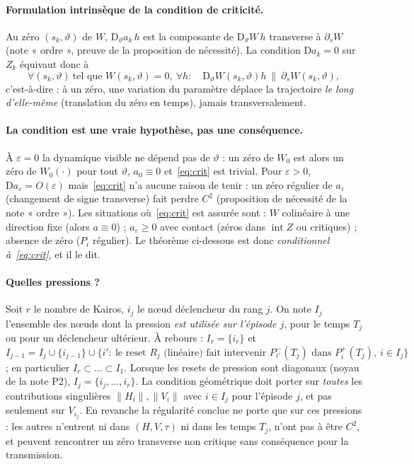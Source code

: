 \documentclass[11pt,a4paper]{article}
\theoremstyle{remark}
\newcommand{\vth}{\vartheta}
\newcommand{\D}{\mathrm D}
\begin{document}
\paragraph{Formulation intrinsèque de la condition de criticité.} Au zéro $(s_k,\vth)$ de $W$, $\D_\vth a_k\,h$ est la composante de $\D_\vth W\,h$ transverse à $\partial_sW$ (note « ordre », preuve de la proposition de nécessité). La condition $\D a_k=0$ sur $Z_k$ équivaut donc à
\begin{equation}\label{eq:crit}
\forall(s_k,\vth)\ \text{tel que } W(s_k,\vth)=0,\ \forall h:\quad \D_\vth W(s_k,\vth)h\ \parallel\ \partial_sW(s_k,\vth),
\end{equation}
c'est-à-dire : à un zéro, une variation du paramètre déplace la trajectoire \emph{le long d'elle-même} (translation du zéro en temps), jamais transversalement.

\paragraph{La condition est une vraie hypothèse, pas une conséquence.} À $\varepsilon=0$ la dynamique visible ne dépend pas de $\vth$ : un zéro de $W_0$ est alors un zéro de $W_0(\cdot)$ pour tout $\vth$, $a_0\equiv0$ et~\eqref{eq:crit} est trivial. Pour $\varepsilon>0$, $\D a_\varepsilon=O(\varepsilon)$ mais~\eqref{eq:crit} n'a aucune raison de tenir : un zéro régulier de $a_\varepsilon$ (changement de signe transverse) fait perdre $C^2$ (proposition de nécessité de la note « ordre »). Les situations où~\eqref{eq:crit} est assurée sont : $W$ colinéaire à une direction fixe (alors $a\equiv0$) ; $a_\varepsilon\ge0$ avec contact (zéros dans $\operatorname{int}Z$ ou critiques) ; absence de zéro ($P_i$ régulier). Le théorème ci-dessous est donc \emph{conditionnel à~\eqref{eq:crit}}, et il le dit.

\paragraph{Quelles pressions ?} Soit $r$ le nombre de Kairos, $i_j$ le nœud déclencheur du rang $j$. On note $I_j$ l'ensemble des nœuds dont la pression \emph{est utilisée sur l'épisode $j$}, pour le temps $T_j$ ou pour un déclencheur ultérieur. À rebours : $I_r=\{i_r\}$ et $I_{j-1}=I_j\cup\{i_{j-1}\}\cup\{i':\ \text{le reset }R_j\text{ (linéaire) fait intervenir }P_{i'}^-(T_j)\text{ dans }P^+_i(T_j),\ i\in I_j\}$ ; en particulier $I_r\subset\dots\subset I_1$. Lorsque les resets de pression sont diagonaux (noyau de la note P2), $I_j=\{i_j,\dots,i_r\}$. La condition géométrique doit porter sur \emph{toutes} les contributions singulières $\lVert H_i\rVert,\lVert V_i\rVert$ avec $i\in I_j$ pour l'épisode $j$, et pas seulement sur $V_{i_j}$. En revanche la régularité conclue ne porte que sur ces pressions : les autres n'entrent ni dans $(H,V,\tau)$ ni dans les temps $T_j$, n'ont pas à être $C^2$, et peuvent rencontrer un zéro transverse non critique sans conséquence pour la transmission.
\end{document}
